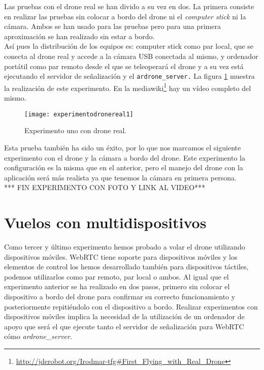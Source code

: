 Las pruebas con el drone real se han divido a su vez en dos. La primera consiste en realizar las pruebas sin colocar a bordo del drone ni el \emph{computer stick} ni la cámara. Ambos se han usado para las pruebas pero para una primera aproximación se han realizado sin estar a bordo.\\

Así pues la distribución de los equipos es: computer stick como par local, que se conecta al drone real y accede a la cámara USB conectada al mismo, y ordenador portátil como par remoto desde el que se teleoperará el drone y a su vez está ejecutando el servidor de señalización y el \texttt{ardrone\_server.} La figura \ref{fig:experimentodronereal1} muestra la realización de este experimento. En la mediawiki\footnote{\url{http://jderobot.org/Irodmar-tfg#First_Flying_with_Real_Drone}}\cite{Mediawiki} hay un vídeo completo del mismo.\\

\begin{figure}[h!]
\centering
\texttt{[image: experimentodronereal1]}
\caption{Experimento uno con drone real.}
\label{fig:experimentodronereal1}
\end{figure}

Esta prueba también ha sido un éxito, por lo que nos marcamos el siguiente experimento con el drone y la cámara a bordo del drone. Este experimento la configuración es la misma que en el anterior, pero el manejo del drone con la aplicación será más realista ya que tenemos la cámara en primera persona.\\

*** FIN EXPERIMENTO CON FOTO Y LINK AL VIDEO***


\section{Vuelos con multidispositivos}

Como tercer y último experimento hemos probado a volar el drone utilizando dispositivos móviles. WebRTC tiene soporte para dispositivos móviles y los elementos de control los hemos desarrollado también para dispositivos táctiles, podemos utilizarlos como par remoto, par local o ambos. Al igual que el experimento anterior se ha realizado en dos pasos, primero sin colocar el dispositivo a bordo del drone para confirmar su correcto funcionamiento y posteriormente repitiéndolo con el dispositivo a bordo. Realizar experimentos con dispositivos móviles implica la necesidad de la utilización de un ordenador de apoyo que será el que ejecute tanto el servidor de señalización para WebRTC cómo \emph{ardrone\_server}.\\

